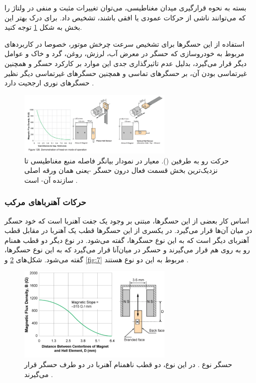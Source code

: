 بسته به نحوه قرارگیری میدان مغناطیسی، می‌توان تغییرات مثبت و منفی در ولتاژ را که می‌توانند ناشی از حرکات عمودی یا افقی باشند، تشخیص داد. برای درک بهتر این بخش به شکل
\ref{fig:5}
توجه کنید.

استفاده از این حسگر‌ها برای تشخیص سرعت چرخش موتور، خصوصا در کاربردهای مربوط به خودروسازی که حسگر در معرض آب، لرزش، روغن، گرد و خاک و عوامل دیگر قرار می‌گیرد، بدلیل عدم تاثیرگذاری جدی این موارد بر کارکرد حسگر و همچنین غیرتماسی بودن آن، بر حسگر‌های تماسی و همچنین حسگر‌های غیرتماسی دیگر نظیر حسگر‌های نوری ارجحیت دارد \cite{ele_hall_2013}.


\begin{figure}[t]
	
	\centering 
	\includegraphics[width=75mm]{Images/side}
	\caption{حرکت رو به طرفین ().
		معیار  در نمودار بیانگر فاصله منبع مغناطیسی تا نزدیک‌ترین بخش قسمت فعال درون حسگر -یعنی همان ورقه اصلی سازنده آن- است
		\cite{alleg}.	
	}\label{fig:5}
\end{figure}


\subsubsection{حرکات آهنربا‌های مرکب}

اساس کار بعضی از این حسگرها، مبتنی بر وجود یک جفت آهنربا است که خود حسگر در میان آن‌ها قرار می‌گیرد. در یکسری از این حسگر‌ها قطب  یک آهنربا در مقابل قطب  آهنربای دیگر است که به این نوع حسگر‌ها،  گفته می‌شود. در نوع دیگر دو قطب همنام  رو به روی هم قرار می‌گیرند و حسگر در میان‌آنا قرار می‌گیرد که به این نوع حسگر‌ها،  گفته می‌شود. شکل‌های 
\ref{fig:6}
و
\ref{fig:7}
مربوط به این دو نوع هستند \cite{alleg}.


\begin{figure}[t]
	
	\centering 
	\includegraphics[width=75mm]{Images/7.pdf}
	\caption{حسگر نوع . در این نوع، دو قطب ناهمنام آهنربا در دو طرف حسگر قرار می‌گیرند
		\cite{alleg}.
	}\label{fig:6}
\end{figure}

